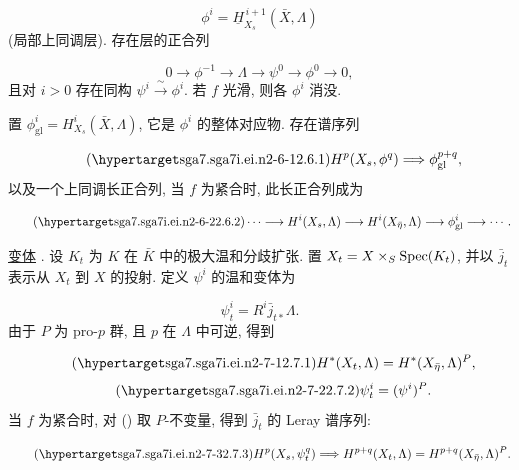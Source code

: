 \begin{equation*}
\phi^i=\underline{H}^{\,i+1}_{X_s}(\bar X,\Lambda)
\end{equation*}
(局部上同调层). 存在层的正合列

\begin{equation*}
0\longrightarrow\phi^{-1}\longrightarrow\Lambda\longrightarrow\psi^0
\longrightarrow\phi^0\longrightarrow0,
\end{equation*}
且对 $i>0$ 存在同构 $\psi^i\xrightarrow{\ \sim\ }\phi^i$. 若 $f$ 光滑, 则各 $\phi^i$ 消没.

置 $\phi^i_{\mathrm{gl}}=H^i_{X_s}(\bar X,\Lambda)$, 它是 $\phi^i$ 的整体对应物. 存在谱序列

\begin{equation*}\tag{\SGARefTarget{sga7.sga7i.ei.n2-6-1}{2.6.1}}
H^p(X_s,\phi^q)\Longrightarrow\phi^{p+q}_{\mathrm{gl}},
\end{equation*}
以及一个上同调长正合列, 当 $f$ 为紧合时, 此长正合列成为

\begin{equation*}\tag{\SGARefTarget{sga7.sga7i.ei.n2-6-2}{2.6.2}}
\cdots\longrightarrow H^i(X_s,\Lambda)\longrightarrow H^i(X_{\bar\eta},\Lambda)
\longrightarrow\phi^i_{\mathrm{gl}}\longrightarrow\cdots.
\end{equation*}

\underline{变体} . 设 $K_t$ 为 $K$ 在 $\bar K$ 中的极大温和分歧扩张. 置 $X_t=X\times_S\operatorname{Spec}(K_t)$, 并以 $\bar j_t$ 表示从 $X_t$ 到 $X$ 的投射. 定义 $\psi^i$ 的温和变体为


\begin{equation*}
\psi^i_t=R^i\bar j_{t*}\Lambda.
\end{equation*}
由于 $P$ 为 pro-$p$ 群, 且 $p$ 在 $\Lambda$ 中可逆, 得到

\begin{equation}\tag{\SGARefTarget{sga7.sga7i.ei.n2-7-1}{2.7.1}}
H^*(X_t,\Lambda)=H^*(X_{\bar\eta},\Lambda)^P,
\end{equation}
\begin{equation}\tag{\SGARefTarget{sga7.sga7i.ei.n2-7-2}{2.7.2}}
\psi^i_t=(\psi^i)^P.
\end{equation}
当 $f$ 为紧合时, 对 () 取 $P$-不变量, 得到 $\bar j_t$ 的 Leray 谱序列:

\begin{equation}\tag{\SGARefTarget{sga7.sga7i.ei.n2-7-3}{2.7.3}}
H^p(X_s,\psi^q_t)\Longrightarrow H^{p+q}(X_t,\Lambda)
=H^{p+q}(X_{\bar\eta},\Lambda)^P.
\end{equation}

